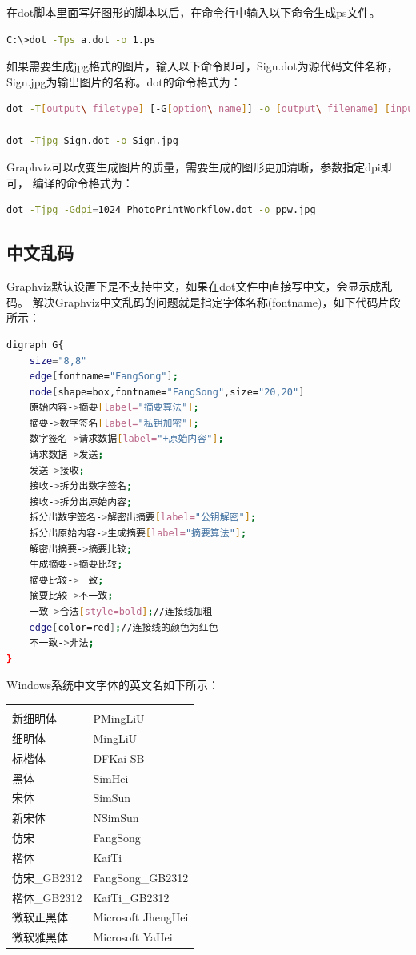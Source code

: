 \documentclass{book}
\begin{document}
在dot脚本里面写好图形的脚本以后，在命令行中输入以下命令生成ps文件。

\begin{lstlisting}[language=Bash]
C:\>dot -Tps a.dot -o 1.ps
\end{lstlisting}

如果需要生成jpg格式的图片，输入以下命令即可，Sign.dot为源代码文件名称，Sign.jpg为输出图片的名称。dot的命令格式为：

\begin{lstlisting}[language=Bash]
dot -T[output\_filetype] [-G[option\_name]] -o [output\_filename] [input\_filename] 

dot -Tjpg Sign.dot -o Sign.jpg
\end{lstlisting}

Graphviz可以改变生成图片的质量，需要生成的图形更加清晰，参数指定dpi即可，
编译的命令格式为：

\begin{lstlisting}[language=Bash]
dot -Tjpg -Gdpi=1024 PhotoPrintWorkflow.dot -o ppw.jpg
\end{lstlisting}

\subsection{中文乱码}

Graphviz默认设置下是不支持中文，如果在dot文件中直接写中文，会显示成乱码。
解决Graphviz中文乱码的问题就是指定字体名称(fontname)，如下代码片段所示：

\begin{lstlisting}[language=Bash]
digraph G{
	size="8,8"
	edge[fontname="FangSong"];
	node[shape=box,fontname="FangSong",size="20,20"]	
	原始内容->摘要[label="摘要算法"];
	摘要->数字签名[label="私钥加密"];
	数字签名->请求数据[label="+原始内容"];
	请求数据->发送;	
	发送->接收;
	接收->拆分出数字签名;
	接收->拆分出原始内容;
	拆分出数字签名->解密出摘要[label="公钥解密"];
	拆分出原始内容->生成摘要[label="摘要算法"];
	解密出摘要->摘要比较;
	生成摘要->摘要比较;
	摘要比较->一致;
	摘要比较->不一致;
	一致->合法[style=bold];//连接线加粗
	edge[color=red];//连接线的颜色为红色
	不一致->非法;	
}
\end{lstlisting}

Windows系统中文字体的英文名如下所示：

\begin{tabular}{ll}
	\multirow{1}{*}{}			
	& \multicolumn{1}{c}{}\\
	新细明体 & PMingLiU\\
	细明体 & MingLiU\\	
	标楷体 & DFKai-SB\\
	黑体 & SimHei\\
	宋体 & SimSun\\
	新宋体 & NSimSun\\
	仿宋 & FangSong\\
	楷体 & KaiTi\\
	仿宋\_GB2312 & FangSong\_GB2312\\	
	楷体\_GB2312 & KaiTi\_GB2312\\
	微软正黑体 & Microsoft JhengHei\\
	微软雅黑体 & Microsoft YaHei\\				
\end{tabular}
\end{document}
